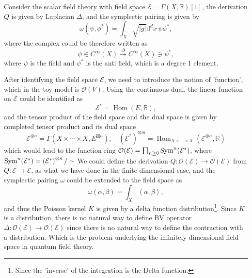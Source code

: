 \documentclass[10pt]{article}
\newcommand{\Hom}{\operatorname{Hom}}
\begin{document}
\begin{example}
  Consider the scalar field theory with field space $ \mathcal{E} = \Gamma(X, \mathbb{R})[1]$, the derivation $ Q$ is given by Laplacian $\Delta $, and the symplectic pairing is given by
  \begin{equation*}
    \omega(\psi, \phi^{*}) = \int _{X} \sqrt{\left| g \right|} \mathrm{d} ^{d} x \, \psi \phi^{*},
  \end{equation*}
  where the complex could be therefore written as
  \begin{equation*}
    \psi \in C^{\infty }(X) \xrightarrow{~\Delta~} C^{\infty }(X) \ni \psi^{*},
  \end{equation*}
  where $ \psi$ is the field and $ \psi^{*}$ is the anti field, which is a degree $1$ element.
\end{example}

After identifying the field space $ \mathcal{E}$, we need to introduce the notion of 'function', which in the toy model is $ \mathcal{O}(V)$. Using the continuous dual, the linear function on $ \mathcal{E}$ could be identified as
\begin{equation*}
  \mathcal{E}^{*} = \Hom(E, \mathbb{R}),
\end{equation*}
and the tensor product of the field space and the dual space is given by completed tensor product and its dual space
\begin{equation*}
  \mathcal{E}^{\otimes n} = \Gamma(X \times \cdots \times X, E^{\boxtimes n}) , \quad \left( \mathcal{E}^{*} \right)^{\otimes m} = \Hom_{X \times \cdots \times X} \left( \mathcal{E}^{\otimes n}, \mathbb{R} \right)
\end{equation*}
which would lead to the function ring $ \mathcal{O}(\mathcal{E}) = \prod_{n \ge 0} \operatorname{Sym}^{n}(\mathcal{E}^{*})$, where $\operatorname{Sym}^{n}(\mathcal{E}^{*}) = \left( \mathcal{E}^{*} \right)^{\otimes n} / \sim$
We could define the derivation $ Q : \mathcal{O}(\mathcal{E}) \rightarrow \mathcal{O}(\mathcal{E})$ from $ Q : \mathcal{E} \rightarrow \mathcal{E}$, as what we have done in the finite dimensional case, and the symplectic pairing $ \omega$ could be extended to the field space as
\begin{equation*}
  \omega(\alpha, \beta) = \int _{X} \left< \alpha, \beta \right>,
\end{equation*}
and thus the Poisson kernel $ K$ is given by a delta function distribution\footnote{Since the 'inverse' of the integration is the Delta function.}.
Since $ K $ is a distribution, there is no natural way to define BV operator $ \Delta : \mathcal{O}(\mathcal{E}) \rightarrow \mathcal{O}(\mathcal{E})$ since there is no natural way to define the contraction with a distribution.
Which is the problem underlying the infinitely dimensional field space in quantum field theory.
\end{document}
